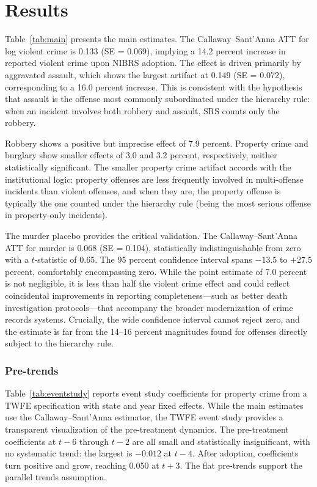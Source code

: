\documentclass[12pt]{article}
\begin{document}
\section{Results}

Table~\ref{tab:main} presents the main estimates. The Callaway--Sant'Anna ATT for log violent crime is 0.133 (SE = 0.069), implying a 14.2 percent increase in reported violent crime upon NIBRS adoption. The effect is driven primarily by aggravated assault, which shows the largest artifact at 0.149 (SE = 0.072), corresponding to a 16.0 percent increase. This is consistent with the hypothesis that assault is the offense most commonly subordinated under the hierarchy rule: when an incident involves both robbery and assault, SRS counts only the robbery.

Robbery shows a positive but imprecise effect of 7.9 percent. Property crime and burglary show smaller effects of 3.0 and 3.2 percent, respectively, neither statistically significant. The smaller property crime artifact accords with the institutional logic: property offenses are less frequently involved in multi-offense incidents than violent offenses, and when they are, the property offense is typically the one counted under the hierarchy rule (being the most serious offense in property-only incidents).

The murder placebo provides the critical validation. The Callaway--Sant'Anna ATT for murder is 0.068 (SE = 0.104), statistically indistinguishable from zero with a $t$-statistic of 0.65. The 95 percent confidence interval spans $-13.5$ to $+27.5$ percent, comfortably encompassing zero. While the point estimate of 7.0 percent is not negligible, it is less than half the violent crime effect and could reflect coincidental improvements in reporting completeness---such as better death investigation protocols---that accompany the broader modernization of crime records systems. Crucially, the wide confidence interval cannot reject zero, and the estimate is far from the 14--16 percent magnitudes found for offenses directly subject to the hierarchy rule.

\subsubsection*{Pre-trends} Table~\ref{tab:eventstudy} reports event study coefficients for property crime from a TWFE specification with state and year fixed effects. While the main estimates use the Callaway--Sant'Anna estimator, the TWFE event study provides a transparent visualization of the pre-treatment dynamics. The pre-treatment coefficients at $t-6$ through $t-2$ are all small and statistically insignificant, with no systematic trend: the largest is $-0.012$ at $t-4$. After adoption, coefficients turn positive and grow, reaching 0.050 at $t+3$. The flat pre-trends support the parallel trends assumption.
\end{document}

